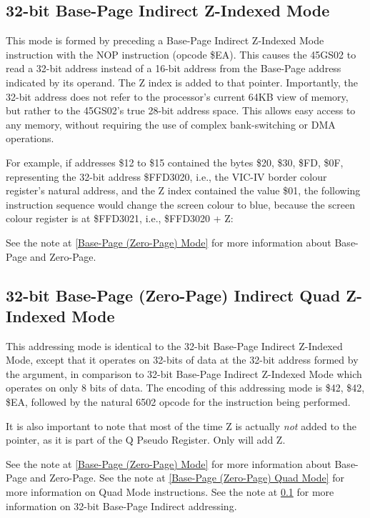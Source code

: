 \subsection{32-bit Base-Page Indirect Z-Indexed Mode}
\label{32-bit Base-Page (Zero-Page) Indirect Z-Indexed Mode}

This mode is formed by preceding a Base-Page Indirect Z-Indexed Mode instruction with
the {NOP} instruction (opcode \$EA).  This causes the 45GS02 to read a 32-bit address instead
of a 16-bit address from the Base-Page address indicated by its operand.  The Z index is added
to that pointer.  Importantly, the 32-bit address does not refer to the processor's current 64KB
view of memory, but rather to the 45GS02's true 28-bit address space. This allows easy access
to any memory, without requiring the use of complex bank-switching or DMA operations.

For example, if addresses \$12 to \$15 contained the bytes \$20, \$30, \$FD, \$0F, representing the 32-bit address \$FFD3020, i.e., the VIC-IV border colour register's natural address, and the
Z index contained the value \$01, the following instruction sequence would change the screen
colour to blue, because the screen colour register is at \$FFD3021, i.e., \$FFD3020 + Z:


See the note at \ref{Base-Page (Zero-Page) Mode} for more information about Base-Page and Zero-Page.


\subsection{32-bit Base-Page (Zero-Page) Indirect Quad Z-Indexed Mode}

This addressing mode is identical to the 32-bit Base-Page Indirect Z-Indexed Mode,
except that it operates on 32-bits of data at the 32-bit address formed by the argument,
in comparison to 32-bit Base-Page Indirect Z-Indexed Mode which operates on only 8 bits
of data.   The encoding of this addressing mode is \$42, \$42, \$EA, followed by the
natural 6502 opcode for the instruction being performed.

It is also important to note that most of the time Z is actually {\em not} added to the
pointer, as it is part of the Q Pseudo Register. Only  will add Z.

See the note at \ref{Base-Page (Zero-Page) Mode} for more information about Base-Page and Zero-Page.
See the note at \ref{Base-Page (Zero-Page) Quad Mode} for more information on Quad Mode instructions.
See the note at \ref{32-bit Base-Page (Zero-Page) Indirect Z-Indexed Mode} for more information on 32-bit Base-Page Indirect addressing.

